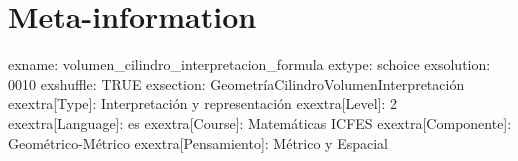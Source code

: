 \documentclass[
]{article}
\begin{document}
\section{Meta-information}\label{meta-information}

exname: volumen\_cilindro\_interpretacion\_formula extype: schoice
exsolution: 0010 exshuffle: TRUE exsection:
Geometría\textbar Cilindro\textbar Volumen\textbar Interpretación
exextra{[}Type{]}: Interpretación y representación exextra{[}Level{]}: 2
exextra{[}Language{]}: es exextra{[}Course{]}: Matemáticas ICFES
exextra{[}Componente{]}: Geométrico-Métrico exextra{[}Pensamiento{]}:
Métrico y Espacial
\end{document}
